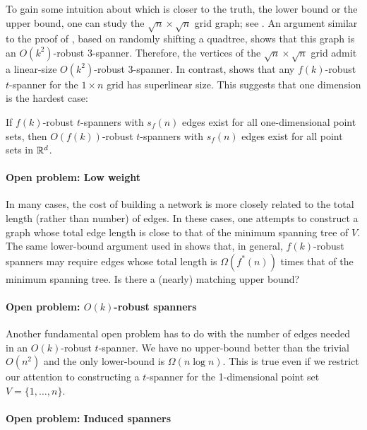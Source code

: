 \documentclass{sig-alternate}
\begin{document}
To gain some intuition about which is closer to the truth, the lower
bound or the upper bound, one can study the $\sqrt{n}\times\sqrt{n}$
grid graph; see .  An argument similar to the proof of
, based on randomly shifting a quadtree, shows that
this graph is an $O(k^2)$-robust $3$-spanner.  Therefore, the vertices
of the $\sqrt{n}\times\sqrt{n}$ grid admit a linear-size $O(k^2)$-robust
3-spanner.  In contrast,  shows that any
$f(k)$-robust $t$-spanner for the $1\times n$ grid has superlinear size.
This suggests that one dimension is the hardest case:

\begin{conj}
If $f(k)$-robust $t$-spanners with $s_f(n)$ edges exist for all one-dimensional point sets, then $O(f(k))$-robust $t$-spanners with $s_f(n)$ edges exist for all point sets in $\mathbb{R}^d$.
\end{conj}


\paragraph{Open problem: Low weight}

In many cases, the cost of building a network is more closely related to
the total length (rather than number) of edges.  In these cases, one
attempts to construct a graph whose total edge length is close to that
of the minimum spanning tree of $V$. The same lower-bound argument used
in  shows that, in general, $f(k)$-robust
spanners may require edges whose total length is $\Omega(f^*(n))$ times
that of the minimum spanning tree.  Is there a (nearly) matching upper bound?

\paragraph{Open problem: $O(k)$-robust spanners}

Another fundamental open problem has to do with the number of edges needed
in an $O(k)$-robust $t$-spanner.  We have no upper-bound better than the
trivial $O(n^2)$ and the only lower-bound is $\Omega(n\log n)$.  This is
true even if we restrict our attention to constructing a $t$-spanner
for the 1-dimensional point set $V=\{1,\ldots,n\}$.

\paragraph{Open problem: Induced spanners}
\end{document}
